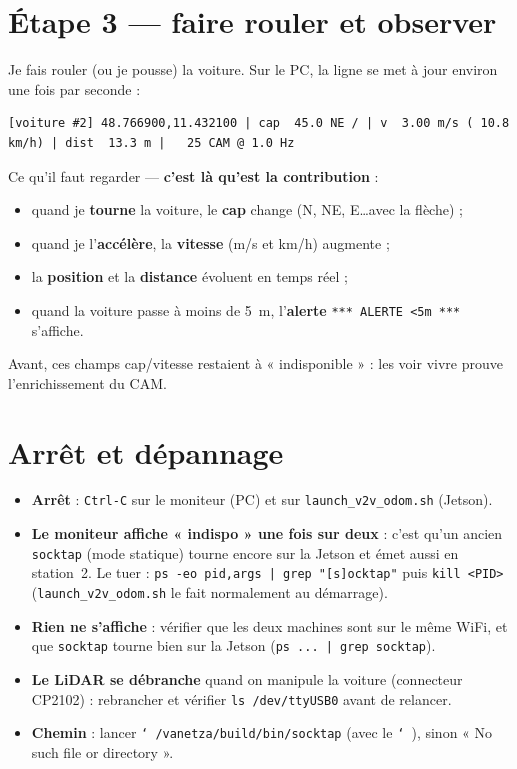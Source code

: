 \documentclass[a4paper,11pt]{article}
\newcommand{\code}[1]{\texttt{#1}}
\begin{document}
\section{Étape 3 --- faire rouler et observer}
Je fais rouler (ou je pousse) la voiture. Sur le PC, la ligne se met à jour environ une fois
par seconde :

\begin{lstlisting}
[voiture #2] 48.766900,11.432100 | cap  45.0 NE / | v  3.00 m/s ( 10.8 km/h) | dist  13.3 m |   25 CAM @ 1.0 Hz
\end{lstlisting}

Ce qu'il faut regarder --- \textbf{c'est là qu'est la contribution} :
\begin{itemize}[leftmargin=1.6em]
  \item quand je \textbf{tourne} la voiture, le \textbf{cap} change (N, NE, E\ldots avec la
        flèche) ;
  \item quand je l'\textbf{accélère}, la \textbf{vitesse} (m/s et km/h) augmente ;
  \item la \textbf{position} et la \textbf{distance} évoluent en temps réel ;
  \item quand la voiture passe à moins de 5~m, l'\textbf{alerte} \code{*** ALERTE <5m ***}
        s'affiche.
\end{itemize}
Avant, ces champs cap/vitesse restaient à « indisponible » : les voir vivre prouve
l'enrichissement du CAM.

\section{Arrêt et dépannage}
\begin{itemize}[leftmargin=1.6em]
  \item \textbf{Arrêt} : \code{Ctrl-C} sur le moniteur (PC) et sur \code{launch\_v2v\_odom.sh}
        (Jetson).
  \item \textbf{Le moniteur affiche « indispo » une fois sur deux} : c'est qu'un ancien
        \code{socktap} (mode statique) tourne encore sur la Jetson et émet aussi en station~2.
        Le tuer : \code{ps -eo pid,args | grep "[s]ocktap"} puis \code{kill <PID>}
        (\code{launch\_v2v\_odom.sh} le fait normalement au démarrage).
  \item \textbf{Rien ne s'affiche} : vérifier que les deux machines sont sur le même WiFi, et
        que \code{socktap} tourne bien sur la Jetson (\code{ps ... | grep socktap}).
  \item \textbf{Le LiDAR se débranche} quand on manipule la voiture (connecteur CP2102) :
        rebrancher et vérifier \code{ls /dev/ttyUSB0} avant de relancer.
  \item \textbf{Chemin} : lancer \code{\char`~/vanetza/build/bin/socktap} (avec le \code{\char`~}),
        sinon « No such file or directory ».
\end{itemize}
\end{document}
